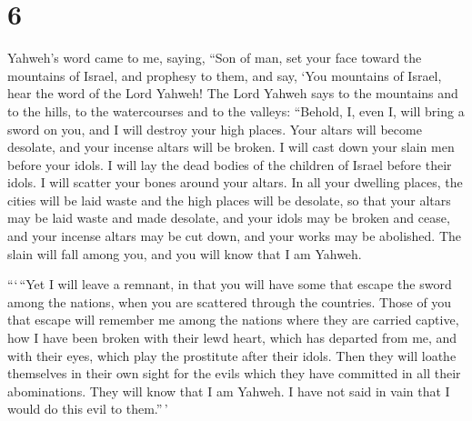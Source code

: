 \hypertarget{section-5}{%
\section{6}\label{section-5}}

 Yahweh's word came to me, saying,  ``Son of
man, set your face toward the mountains of Israel, and prophesy to them,
 and say, `You mountains of Israel, hear the word of the
Lord Yahweh! The Lord Yahweh says to the mountains and to the hills, to
the watercourses and to the valleys: ``Behold, I, even I, will bring a
sword on you, and I will destroy your high places.  Your
altars will become desolate, and your incense altars will be broken. I
will cast down your slain men before your idols.  I will lay
the dead bodies of the children of Israel before their idols. I will
scatter your bones around your altars.  In all your dwelling
places, the cities will be laid waste and the high places will be
desolate, so that your altars may be laid waste and made desolate, and
your idols may be broken and cease, and your incense altars may be cut
down, and your works may be abolished.  The slain will fall
among you, and you will know that I am Yahweh.

 ```\,``Yet I will leave a remnant, in that you will have
some that escape the sword among the nations, when you are scattered
through the countries.  Those of you that escape will
remember me among the nations where they are carried captive, how I have
been broken with their lewd heart, which has departed from me, and with
their eyes, which play the prostitute after their idols. Then they will
loathe themselves in their own sight for the evils which they have
committed in all their abominations.  They will know that I
am Yahweh. I have not said in vain that I would do this evil to
them.''\,'

